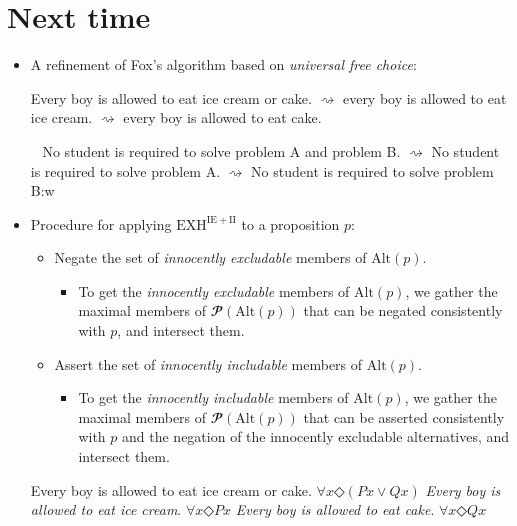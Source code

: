 \documentclass[landscape,cronos,paper=letter]{ling-handout}
\begin{document}
\section*{Next time}

\begin{itemize}

  \item A refinement of Fox's algorithm based on \textit{universal free choice}:

    \pex
Every boy is allowed to eat ice cream or cake.
\a $⇝$ every boy is allowed to eat ice cream.
\a $⇝$ every boy is allowed to eat cake.
    \xe

    \pex~
    No student is required to solve problem A and problem B.
\a $⇝$ No student is required to solve problem A.
    \a $⇝$ No student is required to solve problem B:w
    \xe

 \item Procedure for applying \(\mathrm{EXH^{IE+II}}\) to a proposition \(p\):

\begin{itemize}
\tightlist
\item
  Negate the set of \emph{innocently excludable} members of
  \(\mathrm{Alt}(p)\).

  \begin{itemize}
  \tightlist
  \item
    To get the \emph{innocently excludable} members of
    \(\mathrm{Alt}(p)\), we gather the maximal members of
    \(𝓟(\mathrm{Alt}(p))\) that can be negated consistently with \(p\),
    and intersect them.
  \end{itemize}
\item
  Assert the set of \emph{innocently includable} members of
  \(\mathrm{Alt}(p)\).

  \begin{itemize}
  \tightlist
  \item
    To get the \emph{innocently includable} members of
    \(\mathrm{Alt}(p)\), we gather the maximal members of
    \(𝓟(\mathrm{Alt}(p))\) that can be asserted consistently with \(p\)
    and the negation of the innocently excludable alternatives, and
    intersect them.
  \end{itemize}
\end{itemize}

    \pex\label{universalFC} Every boy is allowed to eat ice cream or cake.
\hfill \(∀ x ◇(Px ∨ Qx)\)
\a \textit{Every boy is allowed to eat ice cream}. \hfill \(∀ x ◇ Px\)
\a \textit{Every boy is allowed to eat cake}. \hfill \(∀ x ◇ Qx\) \xe


\end{itemize}
\end{document}
